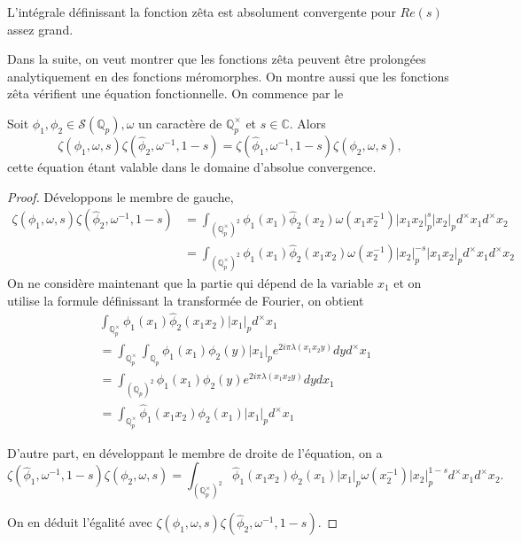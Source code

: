 \begin{lemme}
L'intégrale définissant la fonction zêta est absolument convergente pour $Re(s)$ assez grand.
\end{lemme}

Dans la suite, on veut montrer que les fonctions zêta peuvent être prolongées analytiquement en des fonctions méromorphes. On montre aussi que les fonctions zêta vérifient une équation fonctionnelle. On commence par le
\begin{lemme}
\label{lemme_fun}
Soit $\phi_1, \phi_2 \in \mathcal{S}(\mathbb{Q}_p), \omega$ un caractère de $\mathbb{Q}_p^\times$ et $s \in \mathbb{C}$. Alors
\begin{equation}
\zeta(\phi_1, \omega, s)\zeta(\hat{\phi}_2, \omega^{-1}, 1-s)=\zeta(\hat{\phi}_1, \omega^{-1}, 1-s)\zeta(\phi_2, \omega, s),
\end{equation}
cette équation étant valable dans le domaine d'absolue convergence.
\end{lemme}

\begin{proof}
Développons le membre de gauche,
\begin{align}
\zeta(\phi_1, \omega, s)\zeta(\hat{\phi}_2, \omega^{-1},1-s) &= \int_{{(\mathbb{Q}_p^\times)}^2} \phi_1(x_1)\hat{\phi}_2(x_2)\omega(x_1x_2^{-1})|x_1x_2|_p^s|x_2|_p d^\times x_1 d^\times x_2 \\
&= \int_{{(\mathbb{Q}_p^\times)}^2} \phi_1(x_1)\hat{\phi}_2(x_1x_2)\omega(x_2^{-1})|x_2|_p^{-s}|x_1x_2|_p d^\times x_1 d^\times x_2
\end{align}
On ne considère maintenant que la partie qui dépend de la variable $x_1$ et on utilise la formule définissant la transformée de Fourier, on obtient
\begin{align}
&\int_{\mathbb{Q}_p^\times} \phi_1(x_1)\hat{\phi}_2(x_1x_2)|x_1|_p d^\times x_1 \\
&=\int_{\mathbb{Q}_p^\times} \int_{\mathbb{Q}_p} \phi_1(x_1) \phi_2(y)|x_1|_p e^{2i\pi \lambda(x_1x_2 y)} dy d^\times x_1 \\
&= \int_{{(\mathbb{Q}_p)}^2} \phi_1(x_1)\phi_2(y) e^{2i\pi \lambda(x_1x_2 y)} dy dx_1 \\
&= \int_{\mathbb{Q}_p^\times} \hat{\phi}_1(x_1x_2)\phi_2(x_1)|x_1|_p d^\times x_1
\end{align}

D'autre part, en développant le membre de droite de l'équation, on a
\begin{equation}
\zeta(\hat{\phi}_1, \omega^{-1}, 1-s)\zeta(\phi_2,\omega,s) =  \int_{{(\mathbb{Q}_p^\times)}^2} \hat{\phi}_1(x_1x_2)\phi_2(x_1)|x_1|_p \omega(x_2^{-1})|x_2|_p^{1-s} d^\times x_1 d^\times x_2.
\end{equation}

On en déduit l'égalité avec $\zeta(\phi_1, \omega, s)\zeta(\hat{\phi}_2, \omega^{-1},1-s)$.
\end{proof}

